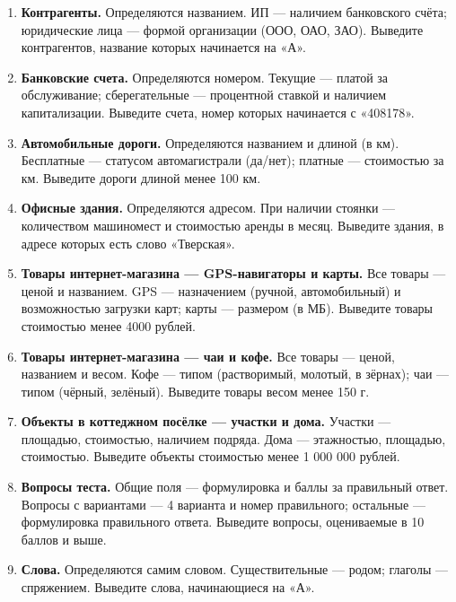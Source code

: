 \begin{enumerate}
    \item \textbf{Контрагенты.}  
    Определяются названием. ИП — наличием банковского счёта; юридические лица — формой организации (ООО, ОАО, ЗАО).  
    Выведите контрагентов, название которых начинается на «А».

    \item \textbf{Банковские счета.}  
    Определяются номером. Текущие — платой за обслуживание; сберегательные — процентной ставкой и наличием капитализации.  
    Выведите счета, номер которых начинается с «408178».

    \item \textbf{Автомобильные дороги.}  
    Определяются названием и длиной (в км). Бесплатные — статусом автомагистрали (да/нет); платные — стоимостью за км.  
    Выведите дороги длиной менее 100 км.

    \item \textbf{Офисные здания.}  
    Определяются адресом. При наличии стоянки — количеством машиномест и стоимостью аренды в месяц.  
    Выведите здания, в адресе которых есть слово «Тверская».

    \item \textbf{Товары интернет-магазина — GPS-навигаторы и карты.}  
    Все товары — ценой и названием. GPS — назначением (ручной, автомобильный) и возможностью загрузки карт; карты — размером (в МБ).  
    Выведите товары стоимостью менее 4000 рублей.

    \item \textbf{Товары интернет-магазина — чаи и кофе.}  
    Все товары — ценой, названием и весом. Кофе — типом (растворимый, молотый, в зёрнах); чаи — типом (чёрный, зелёный).  
    Выведите товары весом менее 150 г.

    \item \textbf{Объекты в коттеджном посёлке — участки и дома.}  
    Участки — площадью, стоимостью, наличием подряда. Дома — этажностью, площадью, стоимостью.  
    Выведите объекты стоимостью менее 1 000 000 рублей.

    \item \textbf{Вопросы теста.}  
    Общие поля — формулировка и баллы за правильный ответ. Вопросы с вариантами — 4 варианта и номер правильного; остальные — формулировка правильного ответа.  
    Выведите вопросы, оцениваемые в 10 баллов и выше.

    \item \textbf{Слова.}  
    Определяются самим словом. Существительные — родом; глаголы — спряжением.  
    Выведите слова, начинающиеся на «А».


\end{enumerate}
